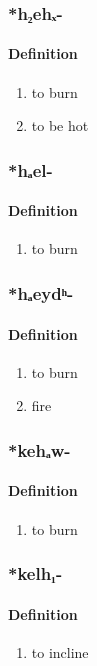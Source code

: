 \subsubsection{\**h₂ehₓ-}
\paragraph{Definition}
\begin{enumerate}
\item to burn
\item to be hot
\end{enumerate}
\subsubsection{\**hₐel-}
\paragraph{Definition}
\begin{enumerate}
\item to burn
\end{enumerate}
\subsubsection{\**hₐeydʰ-}
\paragraph{Definition}
\begin{enumerate}
\item to burn
\item fire
\end{enumerate}
\subsubsection{\**kehₐw-}
\paragraph{Definition}
\begin{enumerate}
\item to burn
\end{enumerate}
\subsubsection{\**kelh₁-}
\paragraph{Definition}
\begin{enumerate}
\item to incline
\end{enumerate}
